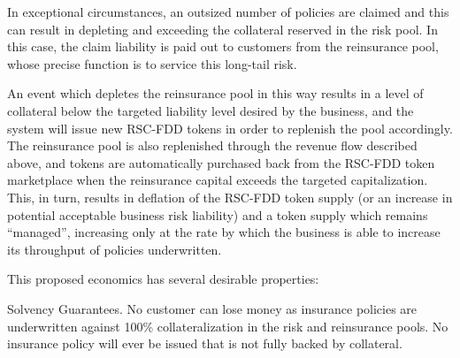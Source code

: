 \documentclass[12pt]{article}
\begin{document}
In exceptional circumstances, an outsized number of policies are claimed and this can result in depleting and exceeding the collateral reserved in the risk pool. In this case, the claim liability is paid out to customers from the reinsurance pool, whose precise function is to service this long-tail risk. 

An event which depletes the reinsurance pool in this way results in a level of collateral below the targeted liability level desired by the business, and the system will issue new RSC-FDD tokens in order to replenish the pool accordingly. The reinsurance pool is also replenished through the revenue flow described above, and tokens are automatically purchased back from the RSC-FDD token marketplace when the reinsurance capital exceeds the targeted capitalization. This, in turn, results in deflation of the RSC-FDD token supply (or an increase in potential acceptable business risk liability) and a token supply which remains “managed”, increasing only at the rate by which the business is able to increase its throughput of policies underwritten. 

This proposed economics has several desirable properties:

Solvency Guarantees. No customer can lose money as insurance policies are underwritten against 100\% collateralization in the risk and reinsurance pools. No insurance policy will ever be issued that is not fully backed by collateral.
\end{document}
